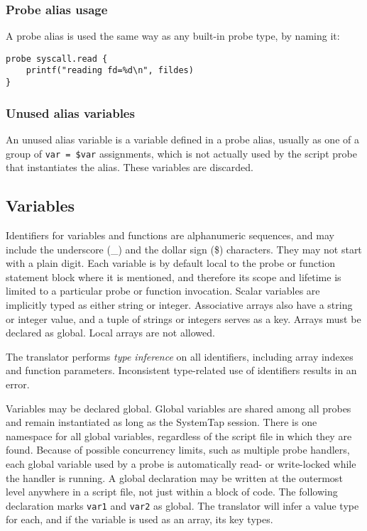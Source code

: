 \documentclass[twoside,english]{article}
\newenvironment{vindent}
{\begin{list}{}{\setlength{\listparindent}{6pt}}
\item[]}
{\end{list}}
\begin{document}
\subsubsection{Probe alias usage}

A probe alias is used the same way as any built-in probe type, by
naming it:

\begin{vindent}
\begin{verbatim}
probe syscall.read {
    printf("reading fd=%d\n", fildes)
}
\end{verbatim}
\end{vindent}

\subsubsection{Unused alias variables}
An unused alias variable is a variable defined in a probe alias, usually
as one of a group of \texttt{var = \$var} assignments, which is not actually
used by the script probe that instantiates the alias. These variables are
discarded.

\subsection{Variables\label{sub:Variables}}
Identifiers for variables and functions are alphanumeric sequences, and may
include the underscore (\_) and the dollar sign (\$) characters. They may
not start with a plain digit. Each variable is by default local to the probe
or function statement block where it is mentioned, and therefore its scope
and lifetime is limited to a particular probe or function invocation. Scalar
variables are implicitly typed as either string or integer. Associative arrays
also have a string or integer value, and a tuple of strings or integers serves
as a key. Arrays must be declared as global. Local arrays
are not allowed.

The translator performs \emph{type inference} on all identifiers, including
array indexes and function parameters. Inconsistent type-related use of identifiers
results in an error.

Variables may be declared global. Global variables are shared among all probes
and remain instantiated as long as the SystemTap session. There is one namespace
for all global variables, regardless of the script file in which they are
found. Because of possible concurrency limits, such as multiple probe handlers,
each global variable used by a probe is automatically read- or write-locked
while the handler is running. A global declaration may be written at the
outermost level anywhere in a script file, not just within a block of code.
The following declaration marks \texttt{var1} and \texttt{var2} as global.
The translator will infer a value type for each, and if the variable is used
as an array, its key types.
\end{document}
